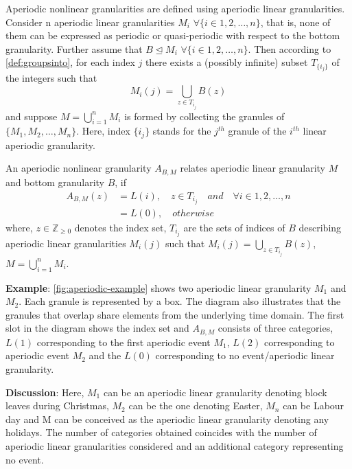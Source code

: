 \documentclass[12pt]{article}
\begin{document}
Aperiodic nonlinear granularities are defined using aperiodic linear granularities. Consider n aperiodic linear granularities \(M_i\) \(\forall \{i\in{1, 2, \dots, n\}}\), that is, none of them can be expressed as periodic or quasi-periodic with respect to the bottom granularity. Further assume that \(B \trianglelefteq M_i\) \(\forall \{i\in{1, 2, \dots, n\}}\). Then according to \autoref{def:groupsinto}, for each index \(j\) there exists a (possibly infinite) subset \(T_{\{i_j\}}\) of the integers such that
\begin{equation*}
M_{i}(j) = \bigcup_{z \in T_{i_j}}B(z)
\end{equation*}
and suppose \(M = \bigcup_{i=1}^{n}M_{i}\) is formed by collecting the granules of \(\{M_1, M_2, \dots, M_n\}\). Here, index \({\{i_j\}}\) stands for the \(j^{th}\) granule of the \(i^{th}\) linear aperiodic granularity.

\begin{definition}\label{aperiodic}
An aperiodic nonlinear granularity $A_{B, M}$ relates aperiodic linear granularity $M$ and bottom granularity $B$, if
\begin{equation}\label{eq:aperiodic}
\begin{split}
A_{B, M}(z) & = L(i), \quad z \in T_{i_j} \quad and \quad \forall i \in {1, 2, \dots, n}\\
     & = L(0), \quad otherwise
\end{split}
\end{equation}
where,
$z \in \mathbb{Z}_{\geq 0}$ denotes the index set,
$T_{i_j}$ are the sets of indices of $B$ describing aperiodic linear granularities $M_{i}(j)$ such that $M_{i}(j) = \bigcup_{z \in T_{i_j}}B(z)$, $M = \bigcup_{i=1}^{n}M_{i}$.
\end{definition}

\textbf{Example}: \autoref{fig:aperiodic-example} shows two aperiodic linear granularity \(M_1\) and \(M_2\). Each granule is represented by a box. The diagram also illustrates that the granules that overlap share elements from the underlying time domain. The first slot in the diagram shows the index set and \(A_{B, M}\) consists of three categories, \(L(1)\) corresponding to the first aperiodic event \(M_1\), \(L(2)\) corresponding to aperiodic event \(M_2\) and the \(L(0)\) corresponding to no event/aperiodic linear granularity.

\textbf{Discussion}: Here, \(M_1\) can be an aperiodic linear granularity denoting block leaves during Christmas, \(M_2\) can be the one denoting Easter, \(M_n\) can be Labour day and M can be conceived as the aperiodic linear granularity denoting any holidays. The number of categories obtained coincides with the number of aperiodic linear granularities considered and an additional category representing no event.
\end{document}
